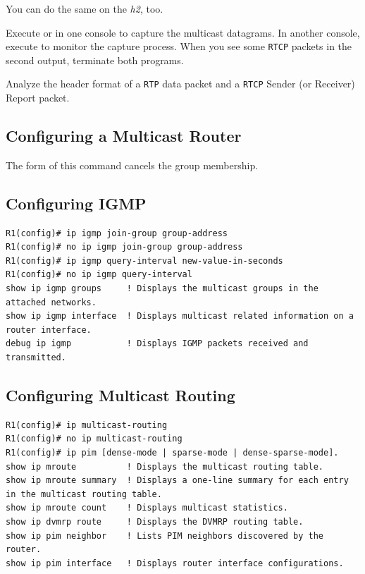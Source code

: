 \documentclass{../UTNetLab}
\begin{document}
You can do the same on the \textit{h2}, too.


Execute  or  in one console to capture the multicast datagrams.
In another console, execute  to monitor the capture process.
When you see some \texttt{RTCP} packets in the second  output, terminate both  programs.

\begin{report}
    \item Analyze the header format of a \texttt{RTP} data packet and a \texttt{RTCP} Sender (or Receiver) Report packet.
\end{report}

\clearpage
\begin{appendices}

    \section{Configuring a Multicast Router}
    The  form of this command cancels the group membership.

    \begin{subappendices}
        \subsection{Configuring IGMP}
        \begin{lstlisting}[language={cisco}, emph={group-address, new-value-in-seconds}]
R1(config)# ip igmp join-group group-address
R1(config)# no ip igmp join-group group-address
R1(config)# ip igmp query-interval new-value-in-seconds
R1(config)# no ip igmp query-interval
show ip igmp groups     ! Displays the multicast groups in the attached networks.
show ip igmp interface  ! Displays multicast related information on a router interface.
debug ip igmp           ! Displays IGMP packets received and transmitted.
    \end{lstlisting}

        \subsection{Configuring Multicast Routing}
        \begin{lstlisting}[language={cisco}]
R1(config)# ip multicast-routing
R1(config)# no ip multicast-routing
R1(config)# ip pim [dense-mode | sparse-mode | dense-sparse-mode].
show ip mroute          ! Displays the multicast routing table.
show ip mroute summary  ! Displays a one-line summary for each entry in the multicast routing table.
show ip mroute count    ! Displays multicast statistics.
show ip dvmrp route     ! Displays the DVMRP routing table.
show ip pim neighbor    ! Lists PIM neighbors discovered by the router.
show ip pim interface   ! Displays router interface configurations.
    \end{lstlisting}


\end{subappendices}
\end{appendices}
\end{document}
